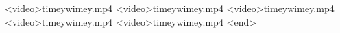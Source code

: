 <video>timeywimey.mp4
<video>timeywimey.mp4
<video>timeywimey.mp4
<video>timeywimey.mp4
<video>timeywimey.mp4
<end>
